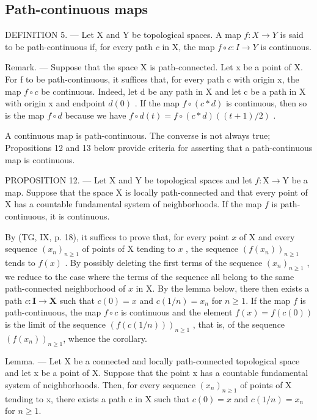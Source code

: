 \subsection{Path-continuous maps}

DEFINITION 5. --- Let X and Y be topological spaces. A map \(f: X \to Y\) is said to be path-continuous if, for every path \(c\) in X, the map \(f \circ c: I \to Y\) is continuous.

Remark. --- Suppose that the space X is path-connected. Let x be a point of X. For f to be path-continuous, it suffices that, for every path c with origin x, the map \(f \circ c\) be continuous. Indeed, let d be any path in X and let c be a path in X with origin x and endpoint \(d(0)\) . If the map \(f \circ (c * d)\) is continuous, then so is the map \(f \circ d\) because we have \(f \circ d(t) = f \circ (c * d)((t + 1)/2)\) .

A continuous map is path-continuous. The converse is not always true; Propositions 12 and 13 below provide criteria for asserting that a path-continuous map is continuous.

PROPOSITION 12. --- Let X and Y be topological spaces and let \(f: \mathrm{X} \to \mathrm{Y}\) be a map. Suppose that the space X is locally path-connected and that every point of X has a countable fundamental system of neighborhoods. If the map \(f\) is path-continuous, it is continuous.

By (TG, IX, p. 18), it suffices to prove that, for every point \(x\) of X and every sequence \((x_n)_{n \geqslant 1}\) of points of X tending to \(x\) , the sequence \((f(x_n))_{n \geqslant 1}\) tends to \(f(x)\) . By possibly deleting the first terms of the sequence \((x_n)_{n \geqslant 1}\) , we reduce to the case where the terms of the sequence all belong to the same path-connected neighborhood of \(x\) in X. By the lemma below, there then exists a path \(c: \mathbf{I} \to \mathbf{X}\) such that \(c(0) = x\) and \(c(1/n) = x_n\) for \(n \geqslant 1\). If the map \(f\) is path-continuous, the map \(f \circ c\) is continuous and the element \(f(x) = f(c(0))\) is the limit of the sequence \((f(c(1/n)))_{n \geqslant 1}\) , that is, of the sequence \((f(x_n))_{n \geqslant 1}\), whence the corollary.

Lemma. --- Let X be a connected and locally path-connected topological space and let x be a point of X. Suppose that the point x has a countable fundamental system of neighborhoods. Then, for every sequence \((x_{n})_{n\geqslant1}\) of points of X tending to x, there exists a path c in X such that \(c(0)=x\) and \(c(1/n)=x_{n}\) for \(n\geqslant1\).

